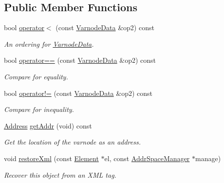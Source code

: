 \subsection*{Public Member Functions}
\begin{DoxyCompactItemize}
\item 
bool \mbox{\hyperlink{struct_varnode_data_ac453e3030db573d022069a80e09ea485}{operator$<$}} (const \mbox{\hyperlink{struct_varnode_data}{Varnode\+Data}} \&op2) const
\begin{DoxyCompactList}\small\item\em An ordering for \mbox{\hyperlink{struct_varnode_data}{Varnode\+Data}}. \end{DoxyCompactList}\item 
bool \mbox{\hyperlink{struct_varnode_data_ae710e3e383ace7e5f939d15bb677c054}{operator==}} (const \mbox{\hyperlink{struct_varnode_data}{Varnode\+Data}} \&op2) const
\begin{DoxyCompactList}\small\item\em Compare for equality. \end{DoxyCompactList}\item 
bool \mbox{\hyperlink{struct_varnode_data_ad28f091080d837492b6397457a77142d}{operator!=}} (const \mbox{\hyperlink{struct_varnode_data}{Varnode\+Data}} \&op2) const
\begin{DoxyCompactList}\small\item\em Compare for inequality. \end{DoxyCompactList}\item 
\mbox{\hyperlink{class_address}{Address}} \mbox{\hyperlink{struct_varnode_data_a815490509cf832fbb9dc45214dd33c8e}{get\+Addr}} (void) const
\begin{DoxyCompactList}\small\item\em Get the location of the varnode as an address. \end{DoxyCompactList}\item 
void \mbox{\hyperlink{struct_varnode_data_a20a4c1ccbaa1f2477d036be8be923894}{restore\+Xml}} (const \mbox{\hyperlink{class_element}{Element}} $\ast$el, const \mbox{\hyperlink{class_addr_space_manager}{Addr\+Space\+Manager}} $\ast$manage)
\begin{DoxyCompactList}\small\item\em Recover this object from an X\+ML tag. \end{DoxyCompactList}\end{DoxyCompactItemize}
